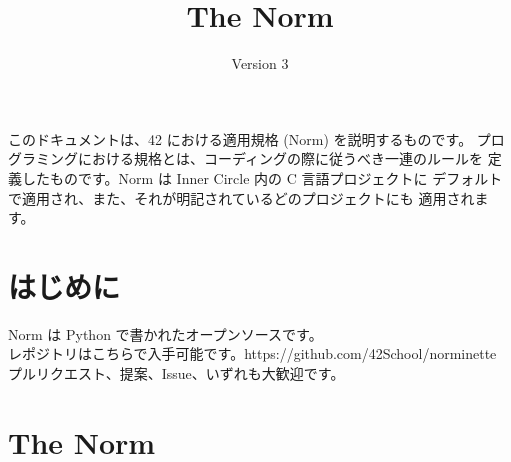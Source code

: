 \documentclass{42-ja}
\begin{document}

\title{The Norm}
\subtitle{Version 3}

\summary
{
	このドキュメントは、42 における適用規格 (Norm) を説明するものです。 
	プログラミングにおける規格とは、コーディングの際に従うべき一連のルールを
	定義したものです。Norm は Inner Circle 内の C 言語プロジェクトに
	デフォルトで適用され、また、それが明記されているどのプロジェクトにも
	適用されます。
}

\maketitle

\tableofcontents



\chapter{はじめに}

    Norm は Python で書かれたオープンソースです。\\
	レポジトリはこちらで入手可能です。https://github.com/42School/norminette\\
	プルリクエスト、提案、Issue、いずれも大歓迎です。

\chapter{The Norm}


\end{document}

